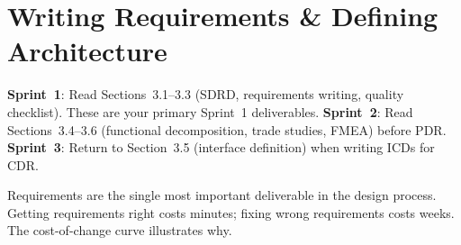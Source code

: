 \chapter{Writing Requirements \& Defining Architecture}\label{ch:requirements}

\begin{tipbox}
\textbf{Sprint~1}: Read Sections~3.1--3.3 (SDRD, requirements writing, quality checklist). These are your primary Sprint~1 deliverables. \textbf{Sprint~2}: Read Sections~3.4--3.6 (functional decomposition, trade studies, FMEA) before PDR. \textbf{Sprint~3}: Return to Section~3.5 (interface definition) when writing ICDs for CDR.
\end{tipbox}

\vspace{1em}

Requirements are the single most important deliverable in the design process. Getting requirements right costs minutes; fixing wrong requirements costs weeks. The cost-of-change curve illustrates why.

